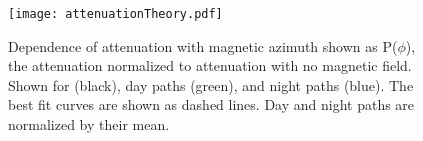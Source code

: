 \documentclass[draft,jgrga]{AGUTeX}
\begin{document}
\begin{figure}[h!t]
   \centering
   \texttt{[image: attenuationTheory.pdf]} 
   \caption{Dependence of attenuation with magnetic azimuth shown as P($\phi$), the attenuation normalized to attenuation with no magnetic field.
   	Shown for \citet{Wait1960a} (black), day paths (green), and night paths (blue).
	The best fit curves are shown as dashed lines.
	Day and night paths are normalized by their mean.}
   \label{attenuationTheory}
\end{figure}

 
\end{document}
